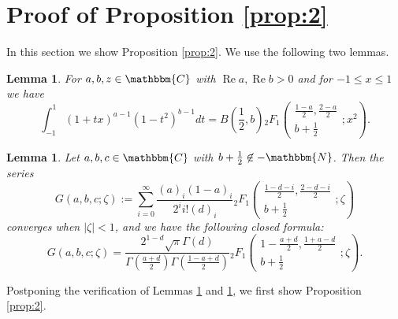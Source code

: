 \documentclass[12pt]{article}
\numberwithin{equation}{section}
\newcommand{\assign}{:=}
\newcommand{\nin}{\not\in}
\newcommand{\tmop}[1]{\ensuremath{\operatorname{#1}}}
\newtheorem{lemma}[corollary]{Lemma}
\newcommand{\mygrammarfootnote}[1]{}
\begin{document}
\section{Proof of Proposition \ref{prop:2}}\label{sec:3}
In this section we show Proposition \ref{prop:2}.
We use the following two lemmas.
\begin{lemma}
  \label{lem4}For $a, b, z \in \mathbbm{C}$ with $\tmop{Re} a, \tmop{Re} b >
  0$ and for $- 1 \leqslant x \leqslant 1$ we have
  \begin{equation}
     \displaystyle\int_{- 1}^1 (1 + tx)^{a - 1} (1 - t^2)^{b - 1} d t = B \left(
    \frac{1}{2}, b \right){}_2 F_1 \left( \begin{array}{c}
      \displaystyle\frac{1 - a}{2}, \frac{2 - a}{2}\\
      b + \frac{1}{2}
    \end{array} ; x^2 \right).
    \label{eqn:lem31}
  \end{equation}
\end{lemma}
\begin{lemma}
  \label{lem:Fisum}Let $a, b, c \in \mathbbm{C}$ with $b + \frac{1}{2} \nin
  -\mathbbm{N}$. Then the series\mygrammarfootnote{maybe, we need a comma here?}
  \[ G (a, b, c ; \zeta) \assign \displaystyle\sum_{i = 0}^{\infty} \frac{(a)_i (1 -
     a)_i}{2^i i! (d)_i}{}_2 F_1 \left( \begin{array}{c}
       \displaystyle\frac{1 - d - i}{2}, \frac{2 - d - i}{2}\\
       b + \frac{1}{2}
     \end{array} ; \zeta \right) \]
  converges when $| \zeta | < 1$, and we have the following closed formula:
  \begin{equation} G (a, b, c ; \zeta) = \frac{2^{1 - d} \sqrt{\pi} \Gamma (d)}{\Gamma
     \left( \frac{a + d}{2} \right) \Gamma \left( \frac{1 - a + d}{2} \right)}
    {}_2 F_1 \left( \begin{array}{c}
       \displaystyle1 - \frac{a + d}{2}, \frac{1 + a - d}{2}\\
       b + \frac{1}{2}
   \end{array} ; \zeta \right) .  \label{eqn:iF}\end{equation}
\end{lemma}

Postponing the verification of Lemmas \ref{lem4} and \ref{lem:Fisum}, we first
show Proposition \ref{prop:2}.
\end{document}
